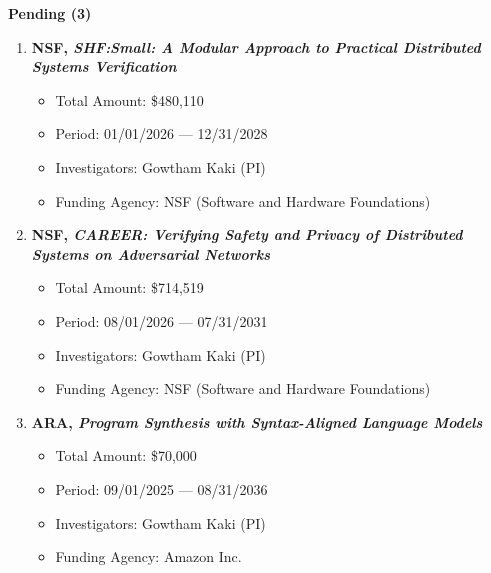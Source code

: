 \documentclass{article}
\begin{document}
\noindent\textbf{Pending (3)}
\begin{enumerate}
  \item {\bf NSF, \emph{SHF:Small: A Modular Approach to Practical Distributed Systems Verification}}
  \begin{itemize}
    \item 
      Total Amount: \$480,110
    \item 
      Period: 01/01/2026 --- 12/31/2028
    \item 
      Investigators: Gowtham Kaki (PI)
    \item 
      Funding Agency: NSF (Software and Hardware Foundations)
\end{itemize}  

  \item {\bf NSF, \emph{CAREER: Verifying Safety and Privacy of Distributed
  Systems on Adversarial Networks}}
  \begin{itemize}
    \item 
      Total Amount: \$714,519
    \item 
      Period: 08/01/2026 --- 07/31/2031
    \item 
      Investigators: Gowtham Kaki (PI)
    \item 
      Funding Agency: NSF (Software and Hardware Foundations)
  \end{itemize}

  \item {\bf ARA, \emph{Program Synthesis with Syntax-Aligned Language Models}}
  \begin{itemize}
    \item 
      Total Amount: \$70,000
    \item 
      Period: 09/01/2025 --- 08/31/2036
    \item 
      Investigators: Gowtham Kaki (PI)
    \item 
      Funding Agency: Amazon Inc.
  \end{itemize}
  
\end{enumerate}
\end{document}
